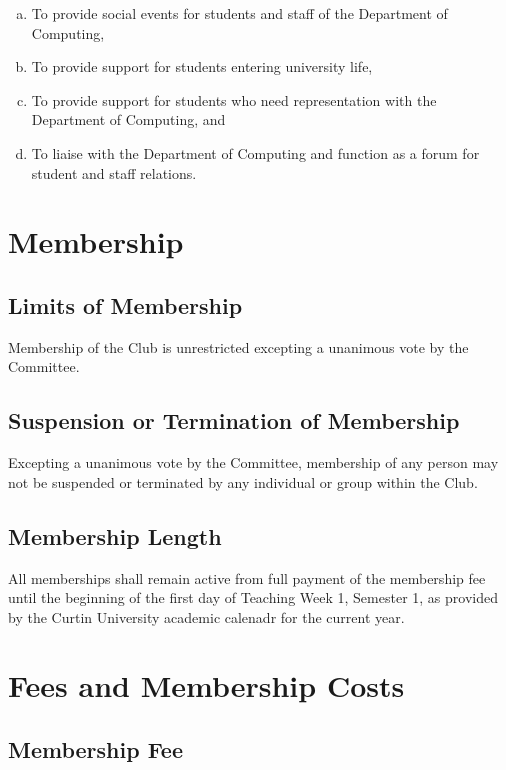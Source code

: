 \documentclass[a4paper,12pt]{article}
\begin{document}
\begin{enumerate}[a)]
	\item To provide social events for students and staff of the Department of Computing,
	\item To provide support for students entering university life,
	\item To provide support for students who need representation with the Department of Computing, and
	\item To liaise with the Department of Computing and function as a forum for student and staff relations.
\end{enumerate}

\section{Membership}

\subsection{Limits of Membership}

Membership of the Club is unrestricted excepting a unanimous vote by the Committee.

\subsection{Suspension or Termination of Membership}

Excepting a unanimous vote by the Committee, membership of any person may not be suspended or terminated by any individual or group within the Club.

\subsection{Membership Length}

All memberships shall remain active from full payment of the membership fee until the beginning of the first day of Teaching Week 1, Semester 1, as provided by the Curtin University academic calenadr for the current year.

\section{Fees and Membership Costs}

\subsection{Membership Fee}
\end{document}
